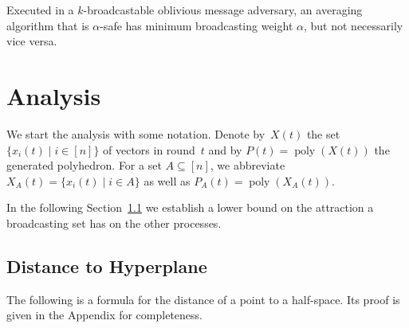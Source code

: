 \documentclass[a4paper,USenglish]{lipics-v2021}
\DeclareMathOperator\poly{poly}
\begin{document}
Executed in a $k$-broadcastable oblivious message adversary, an averaging algorithm that is $\alpha$-safe has minimum broadcasting weight $\alpha$, but not necessarily vice versa.


\section{Analysis}\label{sec:analysis}

We start the analysis with some notation.
Denote by~$X(t)$ the set
$\{ x_i(t) \mid i \in [n] \}$
of vectors in round~$t$
and
by
$P(t) = \poly(X(t))$ the generated polyhedron.
For a set $A \subseteq [n]$, we
abbreviate $X_A(t) = \{ x_i(t) \mid i \in A \}$
as well as $P_A(t) = \poly(X_A(t))$.

In the following Section~\ref{sec:distance_H} we establish a lower bound on the attraction a broadcasting set has on the other processes.


\subsection{Distance to Hyperplane}
\label{sec:distance_H}

The following is a formula for the distance of a point to a half-space.
Its proof is given in the Appendix for completeness.
\end{document}
